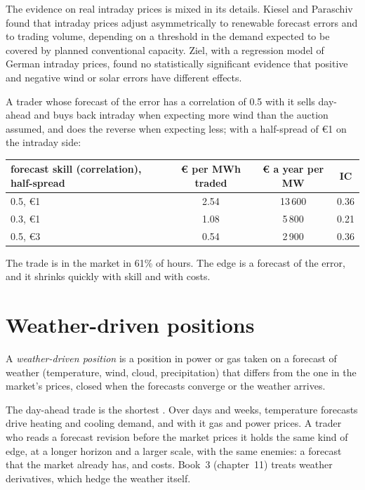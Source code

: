 The evidence on real intraday prices is mixed in its details. Kiesel and Paraschiv found that intraday prices adjust asymmetrically to renewable
forecast errors and to trading volume, depending on a threshold in the demand expected to be covered by planned conventional capacity. Ziel, with a
regression model of German intraday prices, found no statistically significant evidence that positive and negative wind or solar errors have different
effects.

A trader whose forecast of the error has a correlation of 0.5 with it sells day-ahead and buys back intraday when expecting more wind than the auction
assumed, and does the reverse when expecting less; with a half-spread of \euro1 on the intraday side:

\begin{center}
\small
\begin{tabular}{@{}lccc@{}}
\toprule
forecast skill (correlation), half-spread & \euro{} per MWh traded & \euro{} a year per MW & IC\\
\midrule
0.5, \euro1 & 2.54 & 13\,600 & 0.36\\
0.3, \euro1 & 1.08 & 5\,800 & 0.21\\
0.5, \euro3 & 0.54 & 2\,900 & 0.36\\
\bottomrule
\end{tabular}
\end{center}

The trade is in the market in 61\% of hours. The edge is a forecast of the error, and it shrinks quickly with skill and with costs.

\section{Weather-driven positions}

\begin{definition}\label{def:s2:power-and-gas-trading:weather}
A \emph{weather-driven position} is a position in power or gas taken on a forecast of weather (temperature, wind,
cloud, precipitation) that differs from the one in the market's prices, closed when the forecasts converge or the weather arrives.
\end{definition}

The day-ahead trade is the shortest . Over days and weeks, temperature forecasts drive heating and cooling demand, and with
it gas and power prices. A trader who reads a forecast revision before the market prices it holds the same kind of edge, at a longer horizon and a
larger scale, with the same enemies: a forecast that the market already has, and costs. Book~3 (chapter~11) treats weather derivatives, which
hedge the weather itself.

